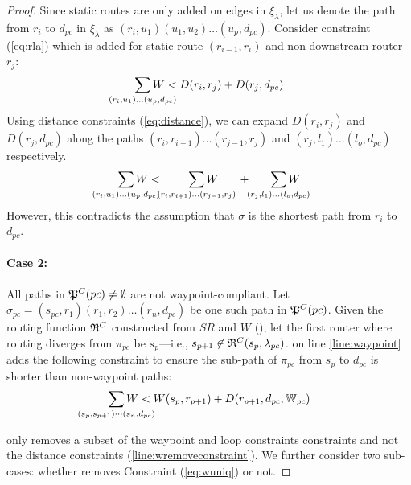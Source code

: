 \begin{proof}
	Since static routes are only added on edges in $\xi_\lambda$, 
	let us denote the path from $r_{i}$ to $d_{pc}$ in 
	$\xi_\lambda$ as $(r_{i}, u_1)(u_1, u_2)\ldots(u_p, d_{pc})$. 
	Consider constraint (\ref{eq:rla}) which is added for static route 
	$(r_{i-1}, r_i)$ and non-downstream router $r_j$:
	\[
	\sum_{\mathclap{\substack{(r_{i}, u_1)\ldots(u_p, d_{pc})}}} 
	W < D(r_i, r_j) + D(r_j, d_{pc}) 
	\]
	Using distance constraints (\ref{eq:distance}), we can expand 
	$D(r_i, r_j)$ and $D(r_j, d_{pc})$ along the paths 
	$(r_i, r_{i+1})\ldots(r_{j-1}, r_j)$ and $(r_j, l_1) \ldots (l_{o}, d_{pc})$
	respectively. 
	\[
	\sum_{\mathclap{\substack{(r_{i}, u_1)\ldots(u_p, d_{pc})}}} 
	W < \hspace{0.8cm} \sum_{\mathclap{\substack{(r_i, r_{i+1})\ldots(r_{j-1}, r_j)}}}W \hspace{0.6cm} + 
	\hspace{0.6cm} \sum_{\mathclap{\substack{(r_j, l_1) \ldots (l_{o}, d_{pc})}}}W  
	\]
	However, this contradicts the assumption that $\sigma$ is 
	the shortest path from $r_i$ to $d_{pc}$. 

	\paragraph{Case 2:} All paths in $\mathfrak{P}^C(pc)
	\not=\emptyset$ are not waypoint-compliant. 
	Let $\sigma_{pc} = (s_{pc}, r_1)(r_1, r_2) \ldots
	(r_n, d_{pc})$ be one such path in $\mathfrak{P}^C(pc)$.
	Given the routing function $\mathfrak{R}^C$ constructed from $SR$ and
	$W$ (), let the first router where routing diverges from $\pi_{pc}$ be $s_p$---i.e.,  
	$s_{p+1} \not\in \mathfrak{R}^C(s_{p}, \lambda_{pc})$. 
	 on line \ref{line:waypoint} adds the following
	constraint to ensure the sub-path of $\pi_{pc}$ 
	from $s_{p}$ to $d_{pc}$ is shorter than non-waypoint paths:
	\begin{equation} \label{eq:wuniq}
	\sum_{\mathclap{\substack{(s_{p}, s_{p+1})\cdots(s_n, d_{pc})}}} 
	W < W(s_{p}, r_{p+1})+ D(r_{p+1}, d_{pc}, \waypt_{pc})
	\end{equation}

	only removes a subset of the waypoint and loop constraints
	constraints and 
	not the distance constraints (\ref{line:wremoveconstraint}). We further consider 
	two sub-cases: whether 
	removes Constraint (\ref{eq:wuniq}) or not. 


\end{proof}

